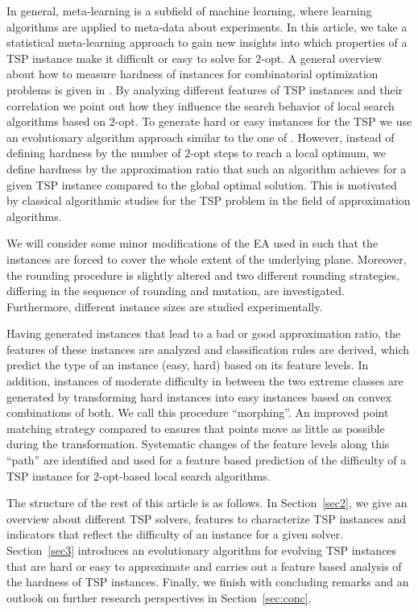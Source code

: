 \documentclass{article}
\begin{document}
In general, meta-learning is a subfield of machine learning, where
learning algorithms are applied to meta-data about experiments.  In
this article, we take a statistical meta-learning approach to gain new
insights into which properties of a TSP instance make it difficult or
easy to solve for $2$-opt. A general overview about how to measure
hardness of instances for combinatorial optimization problems is given
in \cite{SML12}. By analyzing different features of TSP instances and
their correlation we point out how they influence the search behavior
of local search algorithms based on $2$-opt. To generate hard or easy
instances for the TSP we use an evolutionary algorithm approach
similar to the one of \cite{SMHL10}. However, instead of defining
hardness by the number of $2$-opt steps to reach a local optimum, we
define hardness by the approximation ratio that such an algorithm
achieves for a given TSP instance compared to the global optimal
solution. This is motivated by classical algorithmic studies for the
TSP problem in the field of approximation algorithms.

We will consider some minor modifications of the EA used in
\cite{mersmann2012} such that the instances are forced to cover the
whole extent of the underlying plane. Moreover, the rounding procedure
is slightly altered and two different rounding strategies, differing
in the sequence of rounding and mutation, are
investigated. Furthermore, different instance sizes are studied
experimentally.

Having generated instances that lead to a bad or good approximation
ratio, the features of these instances are analyzed and classification
rules are derived, which predict the type of an instance (easy, hard)
based on its feature levels. In addition, instances of moderate
difficulty in between the two extreme classes are generated by
transforming hard instances into easy instances based on convex
combinations of both. We call this procedure
``morphing''. An improved point matching strategy compared to
\cite{mersmann2012} ensures that points move as little as possible
during the transformation. Systematic changes of the feature levels
along this ``path'' are identified and used for a feature based
prediction of the difficulty of a TSP instance for $2$-opt-based local
search algorithms.

The structure of the rest of this article is as follows. In
Section~\ref{sec2}, we give an overview about different TSP solvers,
features to characterize TSP instances and indicators that reflect the
difficulty of an instance for a given solver. Section~\ref{sec3}
introduces an evolutionary algorithm for evolving TSP instances that
are hard or easy to approximate and carries out a feature based
analysis of the hardness of TSP instances. Finally, we finish with
concluding remarks and an outlook on further research perspectives in
Section~\ref{sec:conc}.
\end{document}
